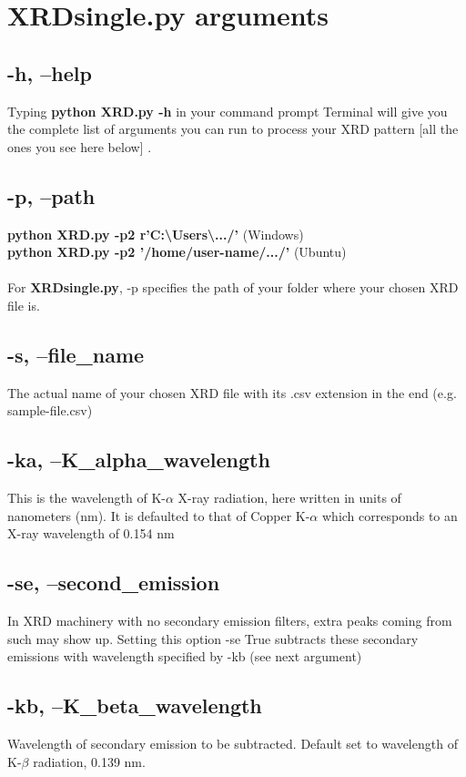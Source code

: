 \documentclass{article}
\begin{document}
\section{XRDsingle.py arguments}

\subsection{-h, --help} 

Typing \textbf{python XRD.py -h} in your command prompt Terminal will give you the complete list of arguments you can run to process your XRD pattern [all the ones you see here below] . 

\subsection{-p, --path}
\textcolor{brightpink}{\textbf{python XRD.py -p2 r'C:\textbackslash Users\textbackslash.../'} \hfill  (Windows)\\\textbf{python XRD.py -p2 '/home/user-name/.../'}  \hfill (Ubuntu)}\\\\
For \textbf{XRDsingle.py}, -p specifies the path of your folder where your chosen XRD file is. 

\subsection{-s, --file\_name}
The actual name of your chosen XRD file with its .csv extension in the end (e.g. sample-file.csv)

\subsection{-ka, --K\_alpha\_wavelength} 
This is the wavelength of K-$\alpha$ X-ray radiation, here written in units of nanometers (nm). It is defaulted to that of Copper K-$\alpha$ which corresponds to an X-ray wavelength of 0.154 nm

\subsection{-se, --second\_emission}
In XRD machinery with no secondary emission filters, extra peaks coming from such may show up. Setting this option -se True subtracts these secondary emissions with wavelength specified by -kb (see next argument)

\subsection{-kb, --K\_beta\_wavelength}
Wavelength of secondary emission to be subtracted. Default set to wavelength of K-$\beta$ radiation, 0.139 nm.
\end{document}
